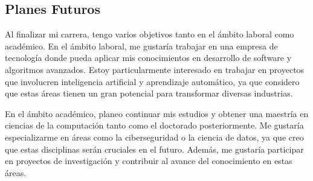 \documentclass{article}
\begin{document}
\subsection{Planes Futuros}
\begin{multicols}{2}
    Al finalizar mi carrera, tengo varios objetivos tanto en el ámbito laboral como académico. En el ámbito laboral, me gustaría trabajar en una empresa de tecnología donde pueda aplicar mis conocimientos en desarrollo de software y algoritmos avanzados. Estoy particularmente interesado en trabajar en proyectos que involucren inteligencia artificial y aprendizaje automático, ya que considero que estas áreas tienen un gran potencial para transformar diversas industrias.

    En el ámbito académico, planeo continuar mis estudios y obtener una maestría en ciencias de la computación tanto como el doctorado posteriormente. Me gustaría especializarme en áreas como la ciberseguridad o la ciencia de datos, ya que creo que estas disciplinas serán cruciales en el futuro. Además, me gustaría participar en proyectos de investigación y contribuir al avance del conocimiento en estas áreas.
\end{multicols}



\end{document}
